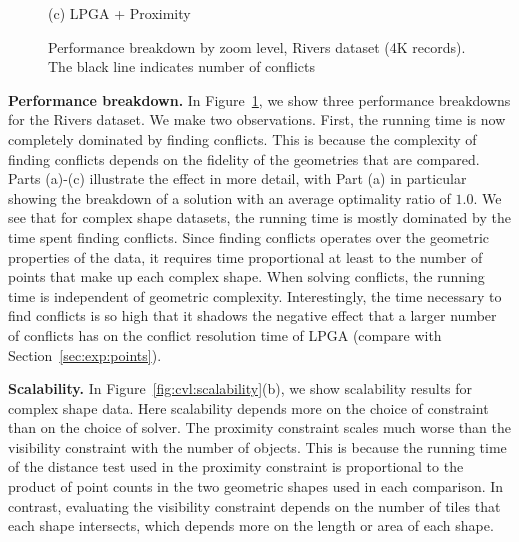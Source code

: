 \documentclass[11pt, oneside]{report}
\newcommand{\minisec}[1]{\noindent\textbf{#1.}}
\begin{document}
\begin{figure}[tb]
\begin{minipage}{0.329\linewidth}
    \centerline{(c) LPGA + Proximity}
  \end{minipage}
  \caption{Performance breakdown by zoom level, Rivers dataset (4K records). The black line indicates number of conflicts} \label{fig:performance:complex}
\end{figure}


\minisec{Performance breakdown}
In Figure~\ref{fig:performance:complex}, we show three performance breakdowns for the Rivers dataset. We make two observations. First, the running time is now completely dominated by finding conflicts. This is because the complexity of finding conflicts depends on the fidelity of the geometries that are compared. 
Parts (a)-(c) illustrate the effect in more detail, with Part (a) in particular showing the breakdown of a solution with an average optimality ratio of $1.0$. We see that for complex shape datasets, the running time is mostly dominated by the time spent finding conflicts. Since finding conflicts operates over the geometric properties of the data, it requires time proportional at least to the number of points that make up each complex shape. When solving conflicts, the running time is independent of geometric complexity. Interestingly, the time necessary to find conflicts is so high that it shadows the negative effect that a larger number of conflicts has on the conflict resolution time of LPGA (compare with Section~\ref{sec:exp:points}).


\minisec{Scalability}
In Figure~\ref{fig:cvl:scalability}(b), we show scalability results for complex shape data. Here scalability depends more on the choice of constraint than on the choice of solver. The proximity constraint scales much worse than the visibility constraint with the number of objects. This is because the running time of the distance test used in the proximity constraint is proportional to the product of point counts in the two geometric shapes used in each comparison. In contrast, evaluating the visibility constraint depends on the number of tiles that each shape intersects, which depends more on the length or area of each shape. 
\end{document}
